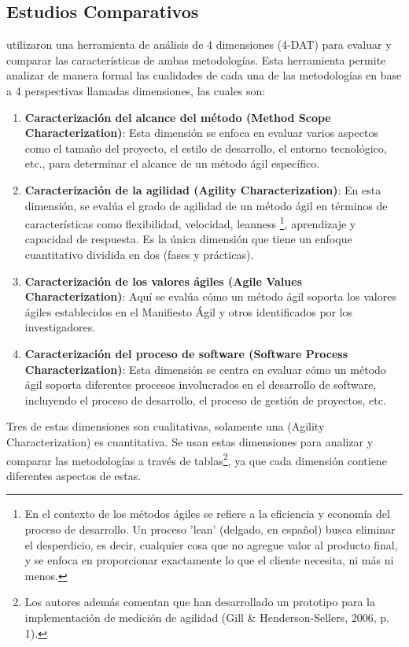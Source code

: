 \documentclass[a4paper,10pt]{article}
\begin{document}
	\subsection{Estudios Comparativos}
	\textcite{Gill_Henderson-Sellers_2006} utilizaron una herramienta de análisis de 4 dimensiones (4-DAT) para evaluar y comparar las características de ambas metodologías. Esta herramienta permite analizar de manera formal las cualidades de cada una de las metodologías en base a 4 perspectivas llamadas dimensiones, las cuales son:
	\begin{enumerate}
		\item \textbf{Caracterización del alcance del método (Method Scope Characterization)}: Esta dimensión se enfoca en evaluar varios aspectos como el tamaño del proyecto, el estilo de desarrollo, el entorno tecnológico, etc., para determinar el alcance de un método ágil específico.
		\item \textbf{Caracterización de la agilidad (Agility Characterization)}: En esta dimensión, se evalúa el grado de agilidad de un método ágil en términos de características como flexibilidad, velocidad, leanness \footnote{En el contexto de los métodos ágiles se refiere a la eficiencia y economía del proceso de desarrollo. Un proceso 'lean' (delgado, en español) busca eliminar el desperdicio, es decir, cualquier cosa que no agregue valor al producto final, y se enfoca en proporcionar exactamente lo que el cliente necesita, ni más ni menos.}, aprendizaje y capacidad de respuesta. Es la única dimensión que tiene un enfoque cuantitativo dividida en dos (fases y prácticas).
		\item \textbf{Caracterización de los valores ágiles (Agile Values Characterization)}: Aquí se evalúa cómo un método ágil soporta los valores ágiles establecidos en el Manifiesto Ágil y otros identificados por los investigadores.
		\item \textbf{Caracterización del proceso de software (Software Process Characterization)}: Esta dimensión se centra en evaluar cómo un método ágil soporta diferentes procesos involucrados en el desarrollo de software, incluyendo el proceso de desarrollo, el proceso de gestión de proyectos, etc.
	\end{enumerate}
	Tres de estas dimensiones son cualitativas, solamente una (Agility Characterization) es cuantitativa. Se usan estas dimensiones para analizar y comparar las metodologías a través de tablas\footnote{Los autores además comentan que han desarrollado un prototipo para la implementación de medición de agilidad (Gill \& Henderson-Sellers, 2006, p. 1).}, ya que cada dimensión contiene diferentes aspectos de estas.
	
\end{document}
